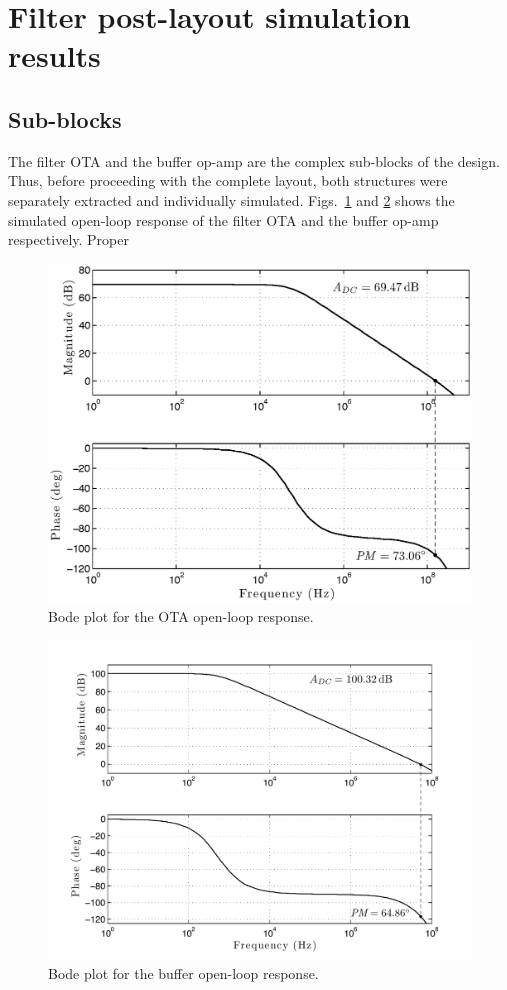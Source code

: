 \section{Filter post-layout simulation results}
\subsection{Sub-blocks}
The filter OTA and the buffer op-amp are the complex sub-blocks of the design. Thus, before proceeding with the complete layout,  both structures were separately extracted and individually simulated. Figs.~\ref{fig:bode_OTA} and \ref{fig:bode_buffer}  shows the simulated open-loop response of the filter OTA and the buffer op-amp respectively. Proper 

\begin{figure}[!t]
	\centering
	\includegraphics[width=5.3in]{./Test/bode_OTA_post}
	\caption{Bode plot for the OTA open-loop response.}\label{fig:bode_OTA}
\end{figure}

\begin{figure}[!t]
	\centering
	\includegraphics[width=5.3in]{./Test/bode_buffer_post}
	\caption{Bode plot for the buffer open-loop response.}\label{fig:bode_buffer}
\end{figure}

